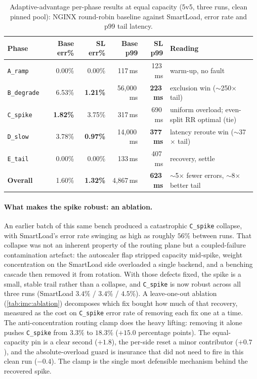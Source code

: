 \begin{table}[H]
  \centering
  \caption[Adaptive-advantage per-phase results, equal capacity]{Adaptive-advantage per-phase results at equal capacity (5v5, three runs, clean pinned pool): NGINX round-robin baseline against SmartLoad, error rate and p99 tail latency.}
  \label{tab:imc:phases-obs}
  \footnotesize
  \setlength{\tabcolsep}{5pt}
  \begin{tabular}{@{}l r r r r l@{}}
    \toprule
    \textbf{Phase} & \textbf{Base err\%} & \textbf{SL err\%} & \textbf{Base p99} & \textbf{SL p99} & \textbf{Reading} \\
    \midrule
    \texttt{A\_ramp}    & 0.00\% & 0.00\% & 117\,ms     & 123\,ms & warm-up, no fault \\
    \texttt{B\_degrade} & 6.53\% & \textbf{1.21\%} & 56{,}000\,ms & \textbf{223\,ms} & exclusion win ($\sim$250$\times$ tail) \\
    \texttt{C\_spike}   & \textbf{1.82\%} & 3.75\% & 317\,ms     & 690\,ms & uniform overload; even-split RR optimal (tie) \\
    \texttt{D\_slow}    & 3.78\% & \textbf{0.97\%} & 14{,}000\,ms & \textbf{377\,ms} & latency reroute win ($\sim$37$\times$ tail) \\
    \texttt{E\_tail}    & 0.00\% & 0.00\% & 133\,ms     & 407\,ms & recovery, settle \\
    \midrule
    \textbf{Overall}    & 1.60\% & \textbf{1.32\%} & 4{,}867\,ms & \textbf{623\,ms} & $\sim$5$\times$ fewer errors, $\sim$8$\times$ better tail \\
    \bottomrule
  \end{tabular}
\end{table}

\paragraph{What makes the spike robust: an ablation.} An earlier batch of this same
bench produced a catastrophic \texttt{C\_spike} collapse, with SmartLoad's error rate
swinging as high as roughly $56\%$ between runs. That collapse was not an inherent
property of the routing plane but a coupled-failure contamination artefact: the
autoscaler flap stripped capacity mid-spike, weight concentration on the SmartLoad side
overloaded a single backend, and a benching cascade then removed it from rotation. With
those defects fixed, the spike is a small, stable trail rather than a collapse, and
\texttt{C\_spike} is now robust across all three runs (SmartLoad $3.4\%$ / $3.4\%$ /
$4.5\%$). A leave-one-out ablation (\cref{tab:imc:ablation}) decomposes which fix bought
how much of that recovery, measured as the cost on \texttt{C\_spike} error rate of
removing each fix one at a time. The anti-concentration routing clamp does the heavy
lifting: removing it alone pushes \texttt{C\_spike} from $3.3\%$ to $18.3\%$ ($+15.0$
percentage points). The equal-capacity pin is a clear second ($+1.8$), the per-side
reset a minor contributor ($+0.7$), and the absolute-overload guard is insurance that
did not need to fire in this clean run ($-0.4$). The clamp is the single most defensible
mechanism behind the recovered spike.


